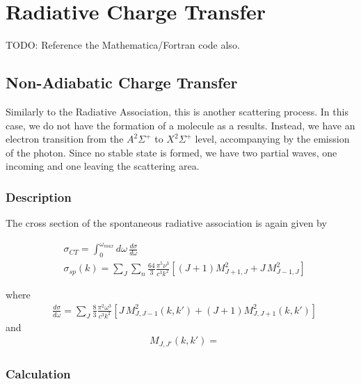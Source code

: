 \chapter{Radiative Charge Transfer}

TODO: Reference the Mathematica/Fortran code also.

\section{Non-Adiabatic Charge Transfer}

Similarly to the Radiative Association, this is another scattering process.  In this case, we do not have the formation of a molecule as a results. Instead, we have an electron transition from the  $ A^2\Sigma^{+} $ to $ X^2\Sigma^{+} $ level, accompanying by the emission of the photon. Since no stable state is formed, we have two partial waves, one incoming and one leaving the scattering area.

\subsection{Description}

The cross section of the spontaneous radiative association is again given by \cite{Zygelman1}

\begin{equation}
\begin{split}
& \sigma_{CT}  = \int_0^{\omega_{max}}{d\omega\,\frac{d\sigma}{d\omega}} \\[.8em]
& \sigma_{sp}(k) = \sum_J\sum_n{\frac{64}{3}\frac{\pi^5\nu^3}{c^3k^2}\left[(J+1)M_{J+1,J}^2 + J\,M_{J-1,J}^2 \right] }
\end{split}
\end{equation}

where
\begin{equation}\label{dint1}
\begin{split}
& \frac{d\sigma}{d\omega} = \sum_{J}{\frac{8}{3}\frac{\pi^2\omega^3}{c^3k^2} \left[J\,M_{J,J-1}^2(k,k') + (J+1)M_{J,J+1}^2(k,k')  \right]}
\end{split}
\end{equation} 
and
\begin{equation}\label{dint2}
\begin{split}
& M_{J,J'}(k,k') = 
\end{split}
\end{equation} 

\subsection{Calculation}



